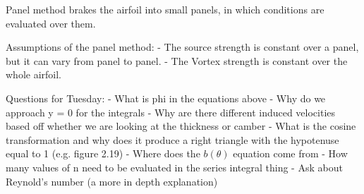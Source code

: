 \documentclass[12pt, letterpaper]{article}
\begin{document}
Panel method brakes the airfoil into small panels, in which conditions are evaluated over them.

Assumptions of the panel method:
- The source strength is constant over a panel, but it can vary from panel to panel.
- The Vortex strength is constant over the whole airfoil.

Questions for Tuesday:
- What is phi in the equations above
- Why do we approach y = 0 for the integrals
- Why are there different induced velocities based off whether we are looking at the thickness or camber 
- What is the cosine transformation and why does it produce a right triangle with the hypotenuse equal to 1 (e.g. figure 2.19)
- Where does the $b(\theta)$ equation come from
- How many values of n need to be evaluated in the series integral thing
- Ask about Reynold's number (a more in depth explanation)
\end{document}
